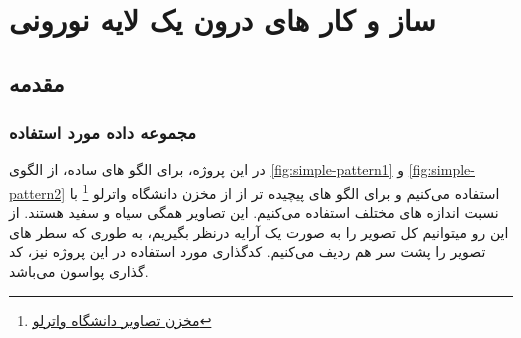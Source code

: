 
\newpage
\chapter{ساز و کار های درون یک لایه نورونی}
\section{مقدمه}
    \subsection{مجموعه داده مورد استفاده}
        در این پروژه، برای الگو های ساده، از الگوی 
        \ref{fig:simple-pattern1} 
        و 
        \ref{fig:simple-pattern2}
        استفاده می‌کنیم و برای الگو های پیچیده تر از از مخزن دانشگاه واترلو
        \footnote{\href{https://links.uwaterloo.ca/Repository.html}{مخزن تصاویر دانشگاه واترلو}}
        با نسبت اندازه های مختلف استفاده می‌کنیم. این تصاویر همگی سیاه و سفید هستند. از این رو میتوانیم کل تصویر را به صورت یک آرایه درنظر بگیریم، به طوری که سطر های تصویر را پشت سر هم ردیف می‌کنیم. کدگذاری مورد استفاده در این پروژه نیز، کد گذاری پواسون می‌باشد.
